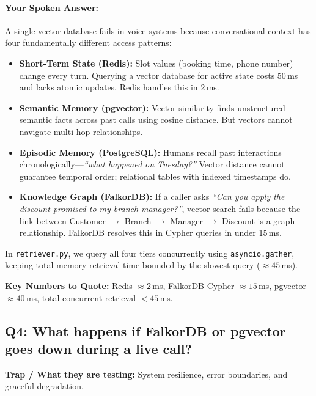 \documentclass[11pt,a4paper]{article}
\begin{document}
\paragraph{Your Spoken Answer:}
A single vector database fails in voice systems because conversational context has four fundamentally different access patterns:
\begin{itemize}
    \item \textbf{Short-Term State (Redis):} Slot values (booking time, phone number) change every turn. Querying a vector database for active state costs 50\,ms and lacks atomic updates. Redis handles this in 2\,ms.
    \item \textbf{Semantic Memory (pgvector):} Vector similarity finds unstructured semantic facts across past calls using cosine distance. But vectors cannot navigate multi-hop relationships.
    \item \textbf{Episodic Memory (PostgreSQL):} Humans recall past interactions chronologically—\textit{``what happened on Tuesday?''} Vector distance cannot guarantee temporal order; relational tables with indexed timestamps do.
    \item \textbf{Knowledge Graph (FalkorDB):} If a caller asks \textit{``Can you apply the discount promised to my branch manager?''}, vector search fails because the link between Customer $\rightarrow$ Branch $\rightarrow$ Manager $\rightarrow$ Discount is a graph relationship. FalkorDB resolves this in Cypher queries in under 15\,ms.
\end{itemize}
In \texttt{retriever.py}, we query all four tiers concurrently using \texttt{asyncio.gather}, keeping total memory retrieval time bounded by the slowest query ($\approx 45$\,ms).

\noindent\textbf{Key Numbers to Quote:} Redis $\approx 2$\,ms, FalkorDB Cypher $\approx 15$\,ms, pgvector $\approx 40$\,ms, total concurrent retrieval $< 45$\,ms.

\vspace{1em}

\subsection*{Q4: What happens if FalkorDB or pgvector goes down during a live call?}
\textbf{Trap / What they are testing:} System resilience, error boundaries, and graceful degradation.
\end{document}
